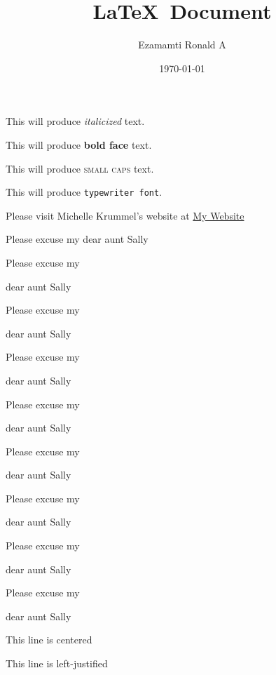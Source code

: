 \documentclass[11pt]{article}
\title{\LaTeX\ Document}
\author{Ezamamti Ronald A}
\date{\today}
\begin{document}
\tableofcontents
\maketitle

This will produce \textit{italicized} text.

This will produce \textbf{bold face} text.

This will produce \textsc{small caps} text.

This will produce \texttt{typewriter font}.

Please visit Michelle Krummel's website at \href{http://michellekrummel.com}{My Website}

\vspace{1cm}

Please excuse my dear aunt Sally

Please excuse my \begin{large}dear aunt Sally\end{large}

Please excuse my \begin{Large}dear aunt Sally\end{Large}

Please excuse my \begin{huge}dear aunt Sally\end{huge}

Please excuse my \begin{Huge}dear aunt Sally\end{Huge}

Please excuse my \begin{normalsize}dear aunt Sally\end{normalsize}

Please excuse my \begin{small}dear aunt Sally\end{small}

Please excuse my \begin{scriptsize}dear aunt Sally\end{scriptsize}

Please excuse my \begin{tiny}dear aunt Sally\end{tiny}

\vspace{1cm}

\begin{center}
    This line is centered
\end{center}

\begin{flushleft}
    This line is left-justified
\end{flushleft}
\end{document}
